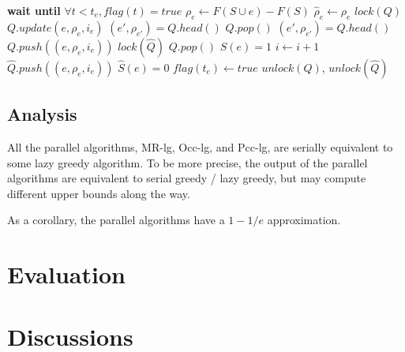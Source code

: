 \documentclass{article}
\newcommand{\Comments}{1}
\newcommand{\note}[2]{\ifnum\Comments=1\textcolor{#1}{#2}\fi}
\newcommand{\xinghao}[1]{\note{red}{[XP: #1]}}
\newcommand{\mrlz}{MR-lg}
\newcommand{\occlz}{Occ-lg}
\newcommand{\pcclz}{Pcc-lg}
\begin{document}
\begin{algorithm}[tb]
  \caption{$commit(e, \rho_e, \widehat\rho_e, t_e, i_e)$}
  \label{alg:cclz:commit}
\begin{algorithmic}
  \STATE \textbf{wait until} $\forall t < t_e, flag(t) = true$
  \COMMENT{\xinghao{timestamp based protocol}}
    \STATE $\rho_e         \leftarrow F(S\cup e) - F(S)$
    \STATE $\widehat\rho_e \leftarrow \rho_e$
  \ENDIF
  \STATE $lock(Q)$
  \COMMENT{\xinghao{Unnecessary -- $Q$ accessed only here}}
  \STATE $Q.update(e, \rho_e, i_e)$
  \STATE $(e', \rho_{e'}) = Q.head()$
    \STATE $Q.pop()$
    \STATE $(e', \rho_{e'}) = Q.head()$
    \STATE $Q.push((e, \rho_e, i_e))$
  \ENDIF
  \STATE $lock(\widehat{Q})$
    \STATE $Q.pop()$
    \STATE $S(e) = 1$
    \STATE $i \leftarrow i+1$
  \ELSE
    \STATE $\widehat{Q}.push((e, \rho_e, i_e))$
    \STATE $\widehat{S}(e) = 0$
  \ENDIF
  \STATE $flag(t_e) \leftarrow true$
  \STATE $unlock(Q)$, $unlock(\widehat{Q})$
  \STATE
  \COMMENT{\xinghao{SS2PL, release all locks simultaneously}}
\end{algorithmic}
\end{algorithm}





\subsection{Analysis}
All the parallel algorithms, \mrlz{}, \occlz{}, and \pcclz{}, are serially equivalent to some lazy greedy algorithm.
To be more precise, the output of the parallel algorithms are equivalent to serial greedy / lazy greedy, but may compute different upper bounds along the way.

As a corollary, the parallel algorithms have a $1-1/e$ approximation.
\section{Evaluation}
\label{sec:evaluation}

\section{Discussions}
\label{sec:discussions}

 




\end{document}
